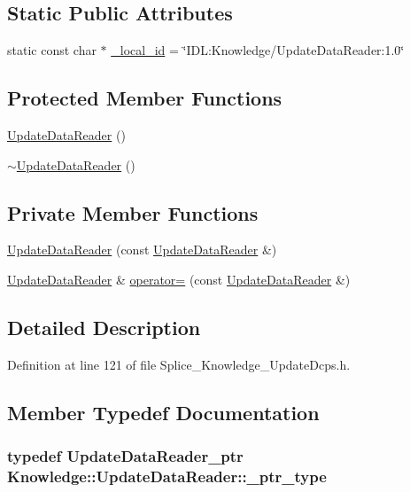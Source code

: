 \subsection*{Static Public Attributes}
\begin{DoxyCompactItemize}
\item 
static const char $\ast$ \hyperlink{classKnowledge_1_1UpdateDataReader_ae66465e3f4a52332b3d16cc911c7b290}{\_\-local\_\-id} = \char`\"{}IDL:Knowledge/UpdateDataReader:1.0\char`\"{}
\end{DoxyCompactItemize}
\subsection*{Protected Member Functions}
\begin{DoxyCompactItemize}
\item 
\hyperlink{classKnowledge_1_1UpdateDataReader_a8ff168e14ceffac28b9731c58dfc4ef4}{UpdateDataReader} ()
\item 
\hyperlink{classKnowledge_1_1UpdateDataReader_af7a92f5093519c82d87abef4b359c04c}{$\sim$UpdateDataReader} ()
\end{DoxyCompactItemize}
\subsection*{Private Member Functions}
\begin{DoxyCompactItemize}
\item 
\hyperlink{classKnowledge_1_1UpdateDataReader_a3ee9adb19925962b373536cc1a3dbf1b}{UpdateDataReader} (const \hyperlink{classKnowledge_1_1UpdateDataReader}{UpdateDataReader} \&)
\item 
\hyperlink{classKnowledge_1_1UpdateDataReader}{UpdateDataReader} \& \hyperlink{classKnowledge_1_1UpdateDataReader_a3eef02ab11696c8063385273271d8de7}{operator=} (const \hyperlink{classKnowledge_1_1UpdateDataReader}{UpdateDataReader} \&)
\end{DoxyCompactItemize}


\subsection{Detailed Description}


Definition at line 121 of file Splice\_\-Knowledge\_\-UpdateDcps.h.



\subsection{Member Typedef Documentation}
\hypertarget{classKnowledge_1_1UpdateDataReader_a5aa1e0d7df2df2db07892433815c0864}{
\subsubsection[{\_\-ptr\_\-type}]{\setlength{\rightskip}{0pt plus 5cm}typedef {\bf UpdateDataReader\_\-ptr} {\bf Knowledge::UpdateDataReader::\_\-ptr\_\-type}}}
\label{d7/d6e/classKnowledge_1_1UpdateDataReader_a5aa1e0d7df2df2db07892433815c0864}


